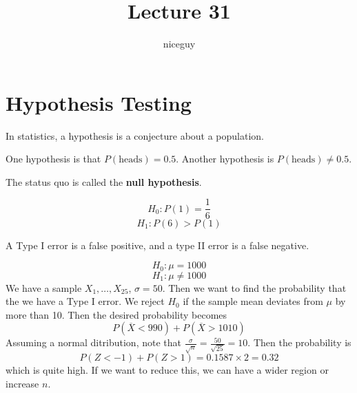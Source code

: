 \documentclass[12pt]{article}
\author{niceguy}
\title{Lecture 31}
\begin{document}
\maketitle

\section{Hypothesis Testing}

In statistics, a hypothesis is a conjecture about a population.

\begin{ex}[Coins]
    One hypothesis is that $P(\text{heads}) = 0.5$. Another hypothesis is $P(\text{heads}) \neq 0.5$.
\end{ex}

The status quo is called the \textbf{null hypothesis}. 

\begin{ex}[Die]
    $$H_0: P(1) = \frac{1}{6}$$
    $$H_1: P(6) > P(1)$$
\end{ex}

\begin{defn}
    A Type I error is a false positive, and a type II error is a false negative.
\end{defn}

\begin{ex}
    $$H_0: \mu = 1000$$
    $$H_1: \mu \neq 1000$$
    We have a sample $X_1,\dots,X_{25}$, $\sigma = 50$. Then we want to find the probability that the we have a Type I error. We reject $H_0$ if the sample mean deviates from $\mu$ by more than 10. Then the desired probability becomes
    $$P(\overline X < 990) + P(\overline X > 1010)$$
    Assuming a normal ditribution, note that $\frac{\sigma}{\sqrt{n}} = \frac{50}{\sqrt{25}} = 10$. Then the probability is
    $$P(Z < -1) + P(Z > 1) = 0.1587 \times 2 = 0.32$$
    which is quite high. If we want to reduce this, we can have a wider region or increase $n$.
\end{ex}
\end{document}

